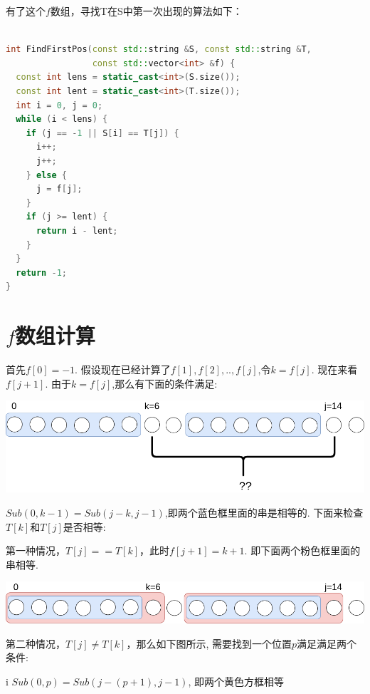 \documentclass{article}
\begin{document}
 有了这个$f$数组，寻找T在S中第一次出现的算法如下：\par
\begin{lstlisting}[language=C++, caption={FindFirstPos in S}]

int FindFirstPos(const std::string &S, const std::string &T,
                 const std::vector<int> &f) {
  const int lens = static_cast<int>(S.size());
  const int lent = static_cast<int>(T.size());
  int i = 0, j = 0;
  while (i < lens) {
    if (j == -1 || S[i] == T[j]) {
      i++;
      j++;
    } else {
      j = f[j];
    }
    if (j >= lent) {
      return i - lent;
    }
  }
  return -1;
}
\end{lstlisting}

\section{$f$数组计算}
首先$f[0]=-1$. 假设现在已经计算了$f[1],f[2],..,f[j]$,令$k=f[j]$. 现在来看$f[j+1]$. 由于$k=f[j]$,那么有下面的条件满足: \par
\includegraphics[scale=0.35]{pic3.png} \par
$Sub(0,k-1)=Sub(j-k,j-1)$,即两个蓝色框里面的串是相等的. 下面来检查$T[k]$和$T[j]$是否相等: \par
第一种情况，$T[j]==T[k]$，此时$f[j+1]=k+1$. 即下面两个粉色框里面的串相等. \par
\includegraphics[scale=0.35]{pic4.png} \par
第二种情况，$T[j] \neq T[k]$，那么如下图所示, 需要找到一个位置$p$满足满足两个条件: \par

i $Sub(0,p)=Sub(j-(p+1),j-1)$, 即两个黄色方框相等 \par
\end{document}
